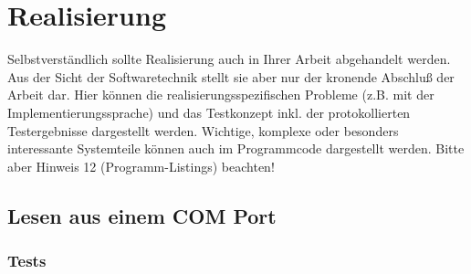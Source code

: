 \chapter{Realisierung}\label{chp:realisierung}
Selbstverständlich sollte Realisierung auch in Ihrer Arbeit abgehandelt werden. Aus der Sicht der Softwaretechnik stellt sie aber nur der kronende Abschluß der Arbeit dar. Hier können die realisierungsspezifischen Probleme (z.B. mit der Implementierungssprache) und das Testkonzept inkl. der protokollierten Testergebnisse dargestellt werden. Wichtige, komplexe oder besonders interessante Systemteile können auch im Programmcode dargestellt werden. Bitte aber Hinweis 12 (Programm-Listings) beachten!


\section{Lesen aus einem COM Port}



\subsection{Tests}